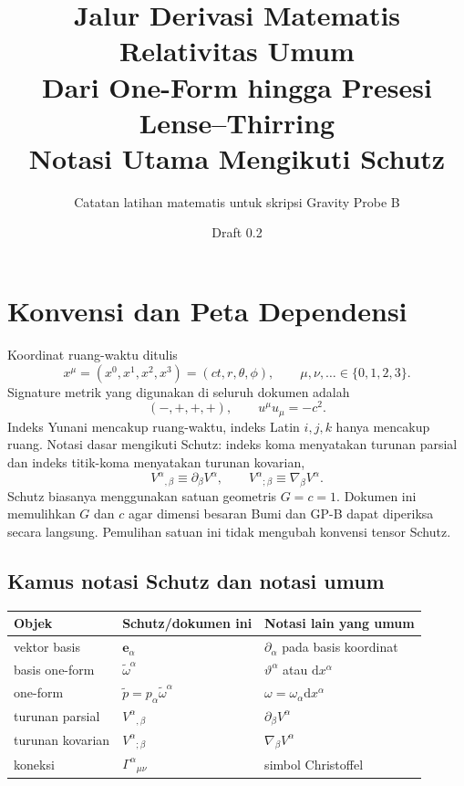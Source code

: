 \documentclass[12pt,a4paper]{report}
\title{Jalur Derivasi Matematis Relativitas Umum\\
\large Dari One-Form hingga Presesi Lense--Thirring\\
\normalsize Notasi Utama Mengikuti Schutz}
\author{Catatan latihan matematis untuk skripsi Gravity Probe B}
\date{Draft 0.2}
\newcommand{\dd}{\mathrm{d}}
\newcommand{\pd}{\partial}
\newcommand{\e}{\mathbf{e}}
\newcommand{\dual}{\widetilde{\omega}}
\newcommand{\oneformp}{\widetilde{p}}
\begin{document}
\maketitle
\tableofcontents

\chapter*{Konvensi dan Peta Dependensi}

Koordinat ruang-waktu ditulis
\[
 x^\mu=(x^0,x^1,x^2,x^3)=(ct,r,\theta,\phi),
 \qquad \mu,\nu,\ldots\in\{0,1,2,3\}.
\]
Signature metrik yang digunakan di seluruh dokumen adalah
\[
 (-,+,+,+),\qquad u^\mu u_\mu=-c^2.
\]
Indeks Yunani mencakup ruang-waktu, indeks Latin $i,j,k$ hanya mencakup ruang.
Notasi dasar mengikuti Schutz: indeks koma menyatakan turunan parsial dan indeks
titik-koma menyatakan turunan kovarian,
\[
 V^\alpha{}_{,\beta}\equiv\pd_\beta V^\alpha,
 \qquad
 V^\alpha{}_{;\beta}\equiv\nabla_\beta V^\alpha.
\]
Schutz biasanya menggunakan satuan geometris $G=c=1$. Dokumen ini memulihkan
$G$ dan $c$ agar dimensi besaran Bumi dan GP-B dapat diperiksa secara langsung.
Pemulihan satuan ini tidak mengubah konvensi tensor Schutz.

\section*{Kamus notasi Schutz dan notasi umum}

\begin{center}
\begin{tabular}{lll}
\hline
Objek & Schutz/dokumen ini & Notasi lain yang umum\\
\hline
vektor basis & $\e_\alpha$ & $\pd_\alpha$ pada basis koordinat\\
basis one-form & $\dual^\alpha$ & $\vartheta^\alpha$ atau $\dd x^\alpha$\\
one-form & $\oneformp=p_\alpha\dual^\alpha$ & $\omega=\omega_\alpha\dd x^\alpha$\\
turunan parsial & $V^\alpha{}_{,\beta}$ & $\pd_\beta V^\alpha$\\
turunan kovarian & $V^\alpha{}_{;\beta}$ & $\nabla_\beta V^\alpha$\\
koneksi & $\Gamma^\alpha{}_{\mu\nu}$ & simbol Christoffel\\
\hline
\end{tabular}
\end{center}
\end{document}
